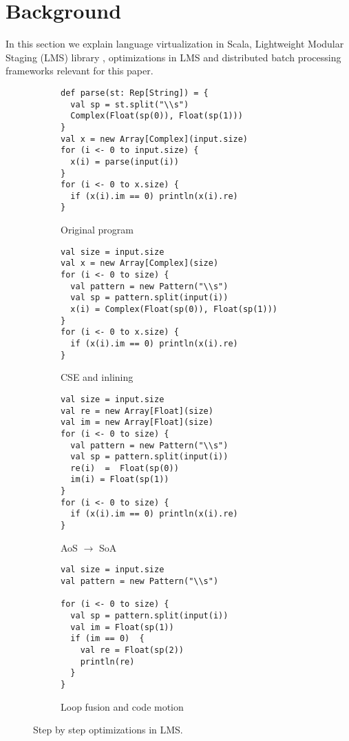 \section{Background}
\label{sec:background}
In this section we explain language virtualization in Scala, Lightweight Modular
Staging (LMS) library \cite{rompf_lightweight_2010, rompf_lightweight_2012},
optimizations in LMS and distributed batch processing frameworks
relevant for this paper.
\begin{figure*}
  \begin{subfigure}[b]{.5\linewidth}
\begin{lstlisting}
def parse(st: Rep[String]) = {               
  val sp = st.split("\\s")
  Complex(Float(sp(0)), Float(sp(1)))
}
val x = new Array[Complex](input.size)
for (i <- 0 to input.size) {
  x(i) = parse(input(i)) 
}
for (i <- 0 to x.size) {
  if (x(i).im == 0) println(x(i).re) 
}
\end{lstlisting}
    \caption{Original program}
    \label{lst:original}
  \end{subfigure}
  \begin{subfigure}[b]{.5\linewidth}
\begin{lstlisting}
val size = input.size
val x = new Array[Complex](size)
for (i <- 0 to size) {
  val pattern = new Pattern("\\s") 
  val sp = pattern.split(input(i))
  x(i) = Complex(Float(sp(0)), Float(sp(1))) 
}
for (i <- 0 to x.size) {
  if (x(i).im == 0) println(x(i).re) 
}
\end{lstlisting}
    \caption{CSE and inlining} 
    \label{lst:cse-inline}
  \end{subfigure}
  \begin{subfigure}[b]{.5\linewidth}
\begin{lstlisting}
val size = input.size
val re = new Array[Float](size)
val im = new Array[Float](size)
for (i <- 0 to size) {
  val pattern = new Pattern("\\s") 
  val sp = pattern.split(input(i))
  re(i)  =  Float(sp(0))
  im(i) = Float(sp(1)) 
}
for (i <- 0 to size) {
  if (x(i).im == 0) println(x(i).re) 
}
\end{lstlisting}
    \caption{AoS $\rightarrow$ SoA}
    \label{lst:aos-soa}
  \end{subfigure}
\begin{subfigure}[b]{.5\linewidth}
\begin{lstlisting}
val size = input.size
val pattern = new Pattern("\\s")
 
for (i <- 0 to size) {
  val sp = pattern.split(input(i))
  val im = Float(sp(1))
  if (im == 0)  {
    val re = Float(sp(2))
    println(re)
  }
}
\end{lstlisting}
    \caption{Loop fusion and code motion}
    \label{lst:fusion-motion}
  \end{subfigure}
  \caption{Step by step optimizations in LMS.}
  \label{lst:step-by-step-lms}
\end{figure*}

